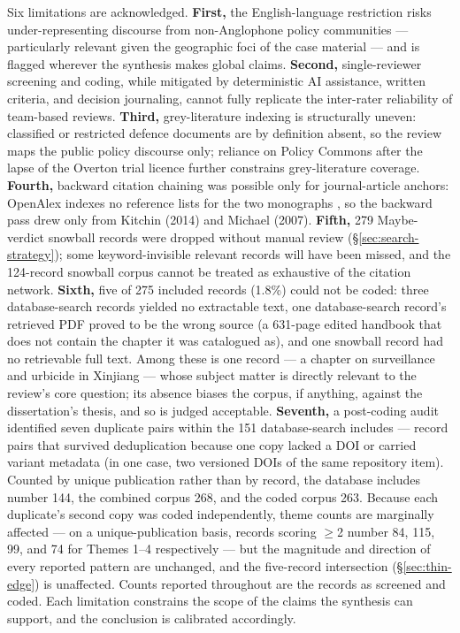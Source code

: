 Six limitations are acknowledged. \textbf{First,} the English-language restriction risks under-representing discourse from non-Anglophone policy communities — particularly relevant given the geographic foci of the case material — and is flagged wherever the synthesis makes global claims. \textbf{Second,} single-reviewer screening and coding, while mitigated by deterministic AI assistance, written criteria, and decision journaling, cannot fully replicate the inter-rater reliability of team-based reviews. \textbf{Third,} grey-literature indexing is structurally uneven: classified or restricted defence documents are by definition absent, so the review maps the public policy discourse only; reliance on Policy Commons after the lapse of the Overton trial licence further constrains grey-literature coverage. \textbf{Fourth,} backward citation chaining was possible only for journal-article anchors: OpenAlex indexes no reference lists for the two monographs \parencite{graham2006,weizman2007}, so the backward pass drew only from Kitchin (2014) and Michael (2007). \textbf{Fifth,} 279 Maybe-verdict snowball records were dropped without manual review (§\ref{sec:search-strategy}); some keyword-invisible relevant records will have been missed, and the 124-record snowball corpus cannot be treated as exhaustive of the citation network. \textbf{Sixth,} five of 275 included records (1.8\%) could not be coded: three database-search records yielded no extractable text, one database-search record's retrieved PDF proved to be the wrong source (a 631-page edited handbook that does not contain the chapter it was catalogued as), and one snowball record had no retrievable full text. Among these is one record — a chapter on surveillance and urbicide in Xinjiang — whose subject matter is directly relevant to the review's core question; its absence biases the corpus, if anything, against the dissertation's thesis, and so is judged acceptable. \textbf{Seventh,} a post-coding audit identified seven duplicate pairs within the 151 database-search includes — record pairs that survived deduplication because one copy lacked a DOI or carried variant metadata (in one case, two versioned DOIs of the same repository item). Counted by unique publication rather than by record, the database includes number 144, the combined corpus 268, and the coded corpus 263. Because each duplicate's second copy was coded independently, theme counts are marginally affected — on a unique-publication basis, records scoring $\geq$2 number 84, 115, 99, and 74 for Themes 1--4 respectively — but the magnitude and direction of every reported pattern are unchanged, and the five-record intersection (§\ref{sec:thin-edge}) is unaffected. Counts reported throughout are the records as screened and coded. Each limitation constrains the scope of the claims the synthesis can support, and the conclusion is calibrated accordingly.

